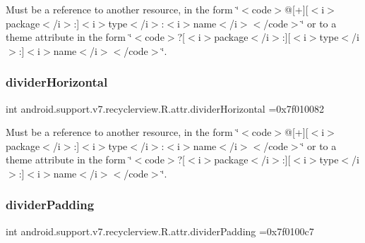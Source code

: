 Must be a reference to another resource, in the form \char`\"{}$<$code$>$@\mbox{[}+\mbox{]}\mbox{[}$<$i$>$package$<$/i$>$\+:\mbox{]}$<$i$>$type$<$/i$>$\+:$<$i$>$name$<$/i$>$$<$/code$>$\char`\"{} or to a theme attribute in the form \char`\"{}$<$code$>$?\mbox{[}$<$i$>$package$<$/i$>$\+:\mbox{]}\mbox{[}$<$i$>$type$<$/i$>$\+:\mbox{]}$<$i$>$name$<$/i$>$$<$/code$>$\char`\"{}. \mbox{\label{classandroid_1_1support_1_1v7_1_1recyclerview_1_1R_1_1attr_aa267b9ed8fced9e055aafa434f464073}} 
\subsubsection{\texorpdfstring{divider\+Horizontal}{dividerHorizontal}}
{\footnotesize\ttfamily int android.\+support.\+v7.\+recyclerview.\+R.\+attr.\+divider\+Horizontal =0x7f010082\hspace{0.3cm}{\ttfamily [static]}}

Must be a reference to another resource, in the form \char`\"{}$<$code$>$@\mbox{[}+\mbox{]}\mbox{[}$<$i$>$package$<$/i$>$\+:\mbox{]}$<$i$>$type$<$/i$>$\+:$<$i$>$name$<$/i$>$$<$/code$>$\char`\"{} or to a theme attribute in the form \char`\"{}$<$code$>$?\mbox{[}$<$i$>$package$<$/i$>$\+:\mbox{]}\mbox{[}$<$i$>$type$<$/i$>$\+:\mbox{]}$<$i$>$name$<$/i$>$$<$/code$>$\char`\"{}. \mbox{\label{classandroid_1_1support_1_1v7_1_1recyclerview_1_1R_1_1attr_a7e3867d1f0be3701cdc6d26f7d401a04}} 
\subsubsection{\texorpdfstring{divider\+Padding}{dividerPadding}}
{\footnotesize\ttfamily int android.\+support.\+v7.\+recyclerview.\+R.\+attr.\+divider\+Padding =0x7f0100c7\hspace{0.3cm}{\ttfamily [static]}}


